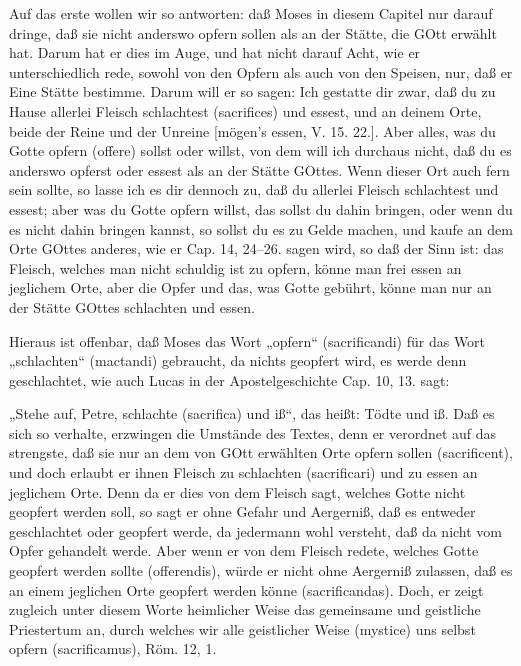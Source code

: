 Auf das erste wollen wir so antworten: daß Moses in diesem Capitel nur darauf dringe, daß sie nicht anderswo opfern sollen als an der Stätte, die GOtt erwählt hat. Darum hat er dies im Auge, und hat nicht darauf Acht, wie er unterschiedlich rede, sowohl von den Opfern als auch von den Speisen, nur, daß er Eine Stätte bestimme. Darum will er so sagen: Ich gestatte dir zwar, daß du zu Hause allerlei Fleisch schlachtest (sacrifices) und essest, und an deinem Orte, beide der Reine und der Unreine [mögen’s essen, V. 15. 22.]. Aber alles, was du Gotte opfern (offere) sollst oder willst, von dem will ich durchaus nicht, daß du es anderswo opferst oder essest als an der Stätte GOttes. Wenn dieser Ort auch fern sein sollte, so lasse ich es dir dennoch zu, daß du allerlei Fleisch schlachtest und essest; aber was du Gotte opfern willst, das sollst du dahin bringen, oder wenn du es nicht dahin bringen kannst, so sollst du es zu Gelde machen, und kaufe an dem Orte GOttes anderes, wie er Cap. 14, 24–26. sagen wird, so daß der Sinn ist: das Fleisch, welches man nicht schuldig ist zu opfern, könne man frei essen an jeglichem Orte, aber die Opfer und das, was Gotte gebührt, könne man nur an der Stätte GOttes schlachten und essen.

Hieraus ist offenbar, daß Moses das Wort „opfern“ (sacrificandi) für das Wort „schlachten“ (mactandi) gebraucht, da nichts geopfert wird, es werde denn geschlachtet, wie auch Lucas in der Apostelgeschichte Cap. 10, 13. sagt:

„Stehe auf, Petre, schlachte (sacrifica) und iß“, das heißt: Tödte und iß. Daß es sich so verhalte, erzwingen die Umstände des Textes, denn er verordnet auf das strengste, daß sie nur an dem von GOtt erwählten Orte opfern sollen (sacrificent), und doch erlaubt er ihnen Fleisch zu schlachten (sacrificari) und zu essen an jeglichem Orte. Denn da er dies von dem Fleisch sagt, welches Gotte nicht geopfert werden soll, so sagt er ohne Gefahr und Aergerniß, daß es entweder geschlachtet oder geopfert werde, da jedermann wohl versteht, daß da nicht vom Opfer gehandelt werde. Aber wenn er von dem Fleisch redete, welches Gotte geopfert werden sollte (offerendis), würde er nicht ohne Aergerniß zulassen, daß es an einem jeglichen Orte geopfert werden könne (sacrificandas). Doch, er zeigt zugleich unter diesem Worte heimlicher Weise das gemeinsame und geistliche Priestertum an, durch welches wir alle geistlicher Weise (mystice) uns selbst opfern (sacrificamus), Röm. 12, 1.

